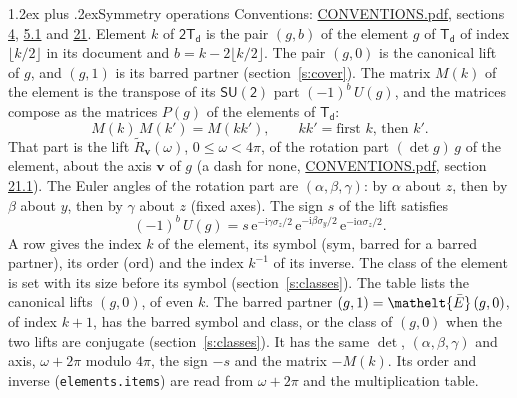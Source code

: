 \documentclass[10pt,a4paper]{article}
\makeatletter
\renewcommand\section{\@startsection{section}{1}{\z@}{-3ex plus -1ex minus -.2ex}%
  {1.2ex plus .2ex}{\normalfont\large\sffamily\bfseries\color{parttitle}}}
\numberwithin{equation}{section}
\newcommand{\eltfont}[1]{{\let\sigma\eltsigma\mathelt{#1}}}
\newcommand{\grp}[1]{\mathsf{#1}}
\newcommand{\elt}[1]{\eltfont{#1}}
\newcommand{\vv}{\mathbf{v}}
\newcommand{\iunit}{\mathrm{i}}
\newcommand{\expe}{\mathrm{e}}
\newcommand{\barred}[1]{\bar{#1}}
\newcommand{\lift}[1]{\tilde{#1}}
\newcommand{\pauli}[1]{\sigma_{#1}}
\makeatother
\begin{document}
\section{Symmetry operations}\label{s:elements}
Conventions: \href{../../CONVENTIONS.pdf}{CONVENTIONS.pdf}, sections \href{../../../rotation/CONVENTIONS.pdf\#conv.4}{4}, \href{../../../rotation/CONVENTIONS.pdf\#conv.5.1}{5.1} and \href{../../CONVENTIONS.pdf\#conv.21}{21}.
\leavevmode\label{n:index.element}\label{n:element.g}Element $k$ of $\grp{2T_{d}}$ is the pair $(g, b)$ of the element $g$ of \href{../../../rotation/data/pdf/Td.pdf}{$\grp{T_{d}}$} of index $\lfloor k/2\rfloor$ in its document and $b = k - 2\lfloor k/2\rfloor$. The pair $(g, 0)$ is the canonical lift of $g$, and $(g, 1)$ is its barred partner (section~\ref{s:cover}). \label{n:matrix.element.pin}\label{n:matrix.element}The matrix $M(k)$ of the element is the transpose of its $\grp{SU(2)}$ part $(-1)^{b}\,U(g)$, and the matrices compose as the matrices $P(g)$ of the elements of $\grp{T_{d}}$:
\begin{equation}\label{e:mprod}M(k)\,M(k') = M(kk'),\qquad kk' = \text{first } k\text{, then } k'.\end{equation}
\leavevmode\label{n:angle.omega}\label{n:vector.axis}\label{n:vector.pole}That part is the lift $\lift{R}_{\vv}(\omega)$, $0 \le \omega < 4\pi$, of the rotation part $(\det g)\,g$ of the element, about the axis $\vv$ of $g$ (a dash for none, \href{../../CONVENTIONS.pdf}{CONVENTIONS.pdf}, section \href{../../CONVENTIONS.pdf\#conv.21.1}{21.1}). \label{n:angle.euler.alpha}\label{n:angle.euler.beta}\label{n:angle.euler.gamma}\label{n:vector.coordinates}The Euler angles of the rotation part are $(\alpha,\beta,\gamma)$: by $\alpha$ about $z$, then by $\beta$ about $y$, then by $\gamma$ about $z$ (fixed axes). \label{n:local.euler.sign}The sign $s$ of the lift satisfies
\begin{equation}\label{e:euler}(-1)^{b}\,U(g) = s\,\expe^{-\iunit\gamma\pauli{z}/2}\,\expe^{-\iunit\beta\pauli{y}/2}\,\expe^{-\iunit\alpha\pauli{z}/2}.\end{equation}
\leavevmode\label{n:index.element.inverse}\label{n:head.sym}\label{n:head.ord}A row gives the index $k$ of the element, its symbol (sym, barred for a barred partner), its order (ord) and the index $k^{-1}$ of its inverse. \label{n:head.class}The class of the element is set with its size before its symbol (section~\ref{s:classes}).
The table lists the canonical lifts $(g, 0)$, of even $k$. The barred partner $(g, 1) = \elt{\barred{E}}\,(g, 0)$, of index $k + 1$, has the barred symbol and class, or the class of $(g, 0)$ when the two lifts are conjugate (section~\ref{s:classes}). It has the same $\det$, $(\alpha,\beta,\gamma)$ and axis, $\omega + 2\pi$ modulo $4\pi$, the sign $-s$ and the matrix $-M(k)$. Its order and inverse (\texttt{elements.items}) are read from $\omega + 2\pi$ and the multiplication table.
\end{document}
